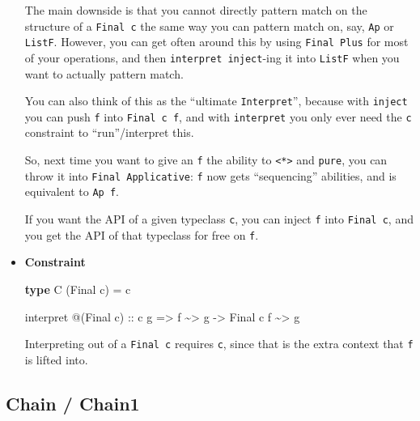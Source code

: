 \documentclass[]{article}
\newenvironment{Shaded}{}{}
\newcommand{\DataTypeTok}[1]{\textcolor[rgb]{0.56,0.13,0.00}{#1}}
\newcommand{\KeywordTok}[1]{\textcolor[rgb]{0.00,0.44,0.13}{\textbf{#1}}}
\newcommand{\NormalTok}[1]{#1}
\newcommand{\OperatorTok}[1]{\textcolor[rgb]{0.40,0.40,0.40}{#1}}
\newcommand{\OtherTok}[1]{\textcolor[rgb]{0.00,0.44,0.13}{#1}}
\begin{document}
\begin{itemize}
  The main downside is that you cannot directly pattern match on the structure
  of a \texttt{Final\ c} the same way you can pattern match on, say, \texttt{Ap}
  or \texttt{ListF}. However, you can get often around this by using
  \texttt{Final\ Plus} for most of your operations, and then
  \texttt{interpret\ inject}-ing it into \texttt{ListF} when you want to
  actually pattern match.

  You can also think of this as the ``ultimate \texttt{Interpret}'', because
  with \texttt{inject} you can push \texttt{f} into \texttt{Final\ c\ f}, and
  with \texttt{interpret} you only ever need the \texttt{c} constraint to
  ``run''/interpret this.

  So, next time you want to give an \texttt{f} the ability to
  \texttt{\textless{}*\textgreater{}} and \texttt{pure}, you can throw it into
  \texttt{Final\ Applicative}: \texttt{f} now gets ``sequencing'' abilities, and
  is equivalent to \texttt{Ap\ f}.

  If you want the API of a given typeclass \texttt{c}, you can inject \texttt{f}
  into \texttt{Final\ c}, and you get the API of that typeclass for free on
  \texttt{f}.
\item
  \textbf{Constraint}

\begin{Shaded}
\begin{Highlighting}[]
\KeywordTok{type} \DataTypeTok{C}\NormalTok{ (}\DataTypeTok{Final}\NormalTok{ c) }\OtherTok{=}\NormalTok{ c}

\NormalTok{interpret }\OperatorTok{@}\NormalTok{(}\DataTypeTok{Final}\NormalTok{ c)}
\OtherTok{    ::}\NormalTok{ c g}
    \OtherTok{=>}\NormalTok{ f }\OperatorTok{\textasciitilde{}>}\NormalTok{ g}
    \OtherTok{{-}>} \DataTypeTok{Final}\NormalTok{ c f }\OperatorTok{\textasciitilde{}>}\NormalTok{ g}
\end{Highlighting}
\end{Shaded}

  Interpreting out of a \texttt{Final\ c} requires \texttt{c}, since that is the
  extra context that \texttt{f} is lifted into.
\end{itemize}

\hypertarget{chain-chain1}{%
\subsection{Chain / Chain1}\label{chain-chain1}}
\end{document}
